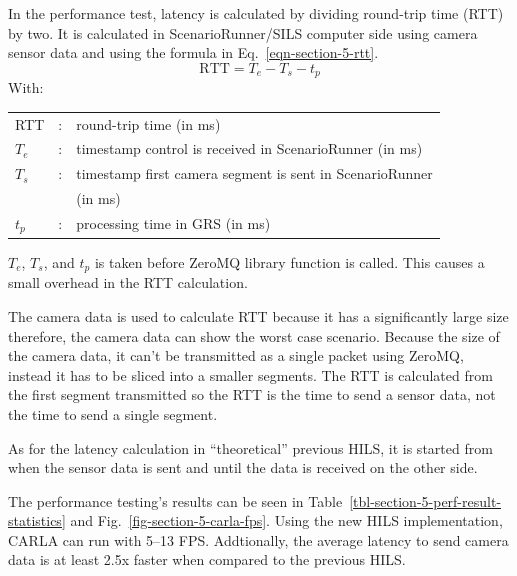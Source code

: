 In the performance test, latency is calculated by dividing round-trip time (RTT) by two.
It is calculated in ScenarioRunner/SILS computer side using camera sensor data
and using the formula in Eq.~\ref{eqn-section-5-rtt}.
\begin{equation}
	\label{eqn-section-5-rtt}
	\text{RTT} = T_{e} - T_{s} - t_p
\end{equation}
With:
\begin{table}[!h]
	\begin{tabular}{l l l}
		RTT     & : & round-trip time (in ms)                                  \\
		$T_{e}$ & : & timestamp control is received in ScenarioRunner (in ms)  \\
		$T_{s}$ & : & timestamp first camera segment is sent in ScenarioRunner \\
		        &   & (in ms)                                                  \\
		$t_p$   & : & processing time in GRS (in ms)
	\end{tabular}
\end{table}

$T_e$, $T_s$, and $t_p$ is taken before ZeroMQ library function is called. This
causes a small overhead in the RTT calculation.

The camera data is used to calculate RTT because it has a significantly large
size therefore, the camera data can show the worst case scenario.  Because the
size of the camera data, it can't be transmitted as a single packet using
ZeroMQ, instead it has to be sliced into a smaller segments. The RTT is
calculated from the first segment transmitted so the RTT is the time to send a
sensor data, not the time to send a single segment.

As for the latency calculation in ``theoretical'' previous HILS, it is started
from when the sensor data is sent and until the data is received on the other
side.

The performance testing's results can be seen in
Table~\ref{tbl-section-5-perf-result-statistics} and
Fig.~\ref{fig-section-5-carla-fps}. Using the new HILS implementation, CARLA can
run with 5--13 FPS. Addtionally, the average latency to send camera data is at
least 2.5x faster when compared to the previous HILS.

